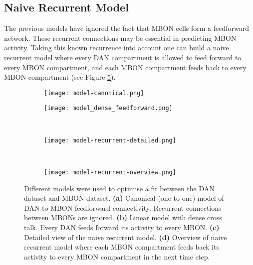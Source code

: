 \documentclass[11pt, A4]{article}
\begin{document}
\begin{multicols}{2}
\subsection{Naive Recurrent Model}

The previous models have ignored the fact that MBON cells form a feedforward network. These recurrent connections may be essential in predicting MBON activity. Taking this known recurrence into account one can build a naive recurrent model where every DAN compartment is allowed to feed forward to every MBON compartment, and each MBON compartment feeds back to every MBON compartment (see Figure \ref{fig:model-recurrent-overview}). 

\begin{figure}[H]
	\centering
	\begin{subfigure}[b]{0.48\textwidth}
        		\caption{}	
		\centering	
        		\texttt{[image: model-canonical.png]}
        		\label{fig:model-canonical}
     	\end{subfigure}
     	\vspace{1em}
     	\begin{subfigure}[b]{0.48\textwidth}
         	\centering
         	\caption{}
         	\texttt{[image: model\_dense\_feedforward.png]}
         	\label{fig:model_dense_feedforward}
     	\end{subfigure}
	~
	\begin{subfigure}[b]{0.48\textwidth}
         	\centering
         	\caption{}
         	\texttt{[image: model-recurrent-detailed.png]}
		\label{fig:model-recurrent-detailed}
     	\end{subfigure}
	~
	\begin{subfigure}[b]{0.48\textwidth}
		\centering
         	\caption{}
        		\texttt{[image: model-recurrent-overview.png]}
		\label{fig:model-recurrent-overview}
     	\end{subfigure}
	\caption{Different models were used to optimise a fit between the DAN dataset and MBON dataset. 
	\textbf{(a)}  Canonical (one-to-one) model of DAN to MBON feedforward connectivity. Recurrent connections between MBONs are ignored. 
	\textbf{(b)}  Linear model with dense cross talk. Every DAN feeds forward its activity to every MBON.
	\textbf{(c)} Detailed view of the naive recurrent model.
	\textbf{(d)}  Overview of naive recurrent model where each MBON compartment feeds back its activity to every MBON compartment in the next time step.
	}
\end{figure}



\end{multicols}
\end{document}
